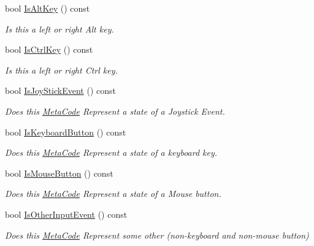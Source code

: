 \begin{DoxyCompactItemize}
bool \hyperlink{classphys_1_1MetaCode_a080323eaed78e0f9b9b3f2049ee036a1}{IsAltKey} () const 
\begin{DoxyCompactList}\small\item\em Is this a left or right Alt key. \item\end{DoxyCompactList}\item 
bool \hyperlink{classphys_1_1MetaCode_a25ce58069979e189e91ecbd77729ed22}{IsCtrlKey} () const 
\begin{DoxyCompactList}\small\item\em Is this a left or right Ctrl key. \item\end{DoxyCompactList}\item 
bool \hyperlink{classphys_1_1MetaCode_a00ad1171e9e081318e6efc25a371ee05}{IsJoyStickEvent} () const 
\begin{DoxyCompactList}\small\item\em Does this \hyperlink{classphys_1_1MetaCode}{MetaCode} Represent a state of a Joystick Event. \item\end{DoxyCompactList}\item 
bool \hyperlink{classphys_1_1MetaCode_ad86e1599eccea8edecb721eb84c06c72}{IsKeyboardButton} () const 
\begin{DoxyCompactList}\small\item\em Does this \hyperlink{classphys_1_1MetaCode}{MetaCode} Represent a state of a keyboard key. \item\end{DoxyCompactList}\item 
bool \hyperlink{classphys_1_1MetaCode_a95fd9fa05a35711c5970490cee7889d1}{IsMouseButton} () const 
\begin{DoxyCompactList}\small\item\em Does this \hyperlink{classphys_1_1MetaCode}{MetaCode} Represent a state of a Mouse button. \item\end{DoxyCompactList}\item 
bool \hyperlink{classphys_1_1MetaCode_a6eb682ae2a56238c6afd3933cb40843b}{IsOtherInputEvent} () const 
\begin{DoxyCompactList}\small\item\em Does this \hyperlink{classphys_1_1MetaCode}{MetaCode} Represent some other (non-\/keyboard and non-\/mouse button) \item\end{DoxyCompactList}\item 

\end{DoxyCompactItemize}
